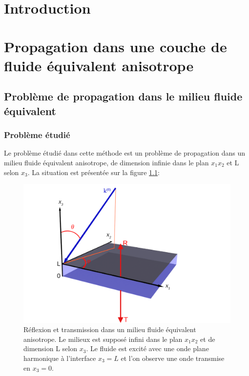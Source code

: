 \documentclass[12pt]{report}
\begin{document}
\newpage
\chapter*{Introduction}
 \setcounter{page}{1}
   
\chapter{Propagation dans une couche de fluide équivalent anisotrope}
\label{Ch_Prop}
\section{Problème de propagation dans le milieu fluide équivalent}
\label{Ch_Prop_S_Pb}
\subsection{Problème étudié}
\label{Ch_Prop_S_Pb_SS_Pb}
    Le problème étudié dans cette méthode est un problème de propagation dans un milieu fluide équivalent anisotrope, de dimension infinie dans le plan $x_1x_2$ et L selon $x_3$.  La situation est présentée sur la figure \ref{Schema}:
    \begin{figure}[ht!]
    \centering
    \includegraphics[scale=1]{Fig3D.pdf}
    \caption{Réflexion et transmission dans un milieu fluide équivalent anisotrope. Le milieux est supposé infini dans le plan $x_1x_2$ et de dimension L selon $x_3$. Le fluide est excité avec une onde plane harmonique à l'interface $x_3=L$ et l'on observe une onde transmise en $x_3=0$. }
    \label{Schema}
    \end{figure}
    
\end{document}
